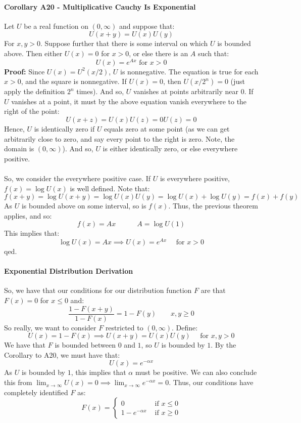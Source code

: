 \documentclass[12pt,a4paper]{article}
\newcommand{\1}[1]{\mathbbm{1}\left\{ #1 \right\}}
\begin{document}
\paragraph{Corollary A20 - Multiplicative Cauchy Is Exponential} Let $U$ be a real function on $(0,\infty)$ and suppose that:
$$
	U(x + y) = U(x)U(y)
$$
For $x,y > 0$. Suppose further that there is some interval on which $U$ is bounded above. Then either $U(x) = 0$ for $x > 0$, or else there is an $A$ such that:
$$
	U(x) = e^{Ax} \text{ for $x > 0$}
$$
\textbf{Proof:} Since $U(x) = U^2(x/2)$, $U$ is nonnegative. The equation is true for each $x > 0$, and the square is nonnegative. If $U(x) = 0$, then $U(x/2^n) = 0$ (just apply the definition $2^n$ times). And so, $U$ vanishes at points arbitrarily near $0$. If $U$ vanishes at a point, it must by the above equation vanish everywhere to the right of the point:
$$
	U(x + z) = U(x)U(z) = 0U(z) = 0
$$
Hence, $U$ is identically zero if $U$ equals zero at some point (as we can get arbitrarily close to zero, and say every point to the right is zero. Note, the domain is $(0,\infty)$). And so, $U$ is either identically zero, or else everywhere positive.
\\\\
So, we consider the everywhere positive case. If $U$ is everywhere positive, $f(x) = \log U(x)$ is well defined. Note that:
$$
	f(x + y) = \log U(x + y) = \log U(x)U(y) = \log U(x) + \log U(y) = f(x) + f(y)
$$
As $U$ is bounded above on some interval, so is $f(x)$. Thus, the previous theorem applies, and so:
$$
	f(x) = Ax \quad\quad\quad A = \log U(1)
$$
This implies that:
$$
	\log U(x) = Ax \implies U(x) = e^{Ax} \quad\text{ for $x > 0$}
$$
qed.

\paragraph{Exponential Distribution Derivation} So, we have that our conditions for our distribution function $F$ are that $F(x) = 0$ for $x \leq 0$ and:
$$
	\frac{1 - F(x + y)}{1 - F(x)} = 1 - F(y) \quad\quad x,y \geq 0
$$
So really, we want to consider $F$ restricted to $(0,\infty)$. Define:
$$
	U(x) = 1 - F(x) \implies
	U(x + y) = U(x)U(y) \quad\text{ for $x,y > 0$}
$$
We have that $F$ is bounded between $0$ and $1$, so $U$ is bounded by $1$. By the Corollary to A20, we must have that:
$$
	U(x) = e^{-\alpha x}
$$
As $U$ is bounded by $1$, this implies that $\alpha$ must be positive. We can also conclude this from $\lim_{x \to \infty} U(x) = 0 \implies \lim_{x \to \infty} e^{-\alpha x} = 0$. Thus, our conditions have completely identified $F$ as:
$$
	F(x) =
	\begin{cases}
	0 & \text{ if $x \leq 0$}\\
	1 - e^{-\alpha x} & \text{ if $x \geq 0$}
	\end{cases}
$$
\end{document}

